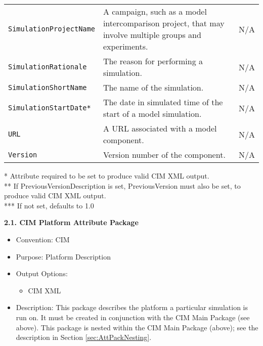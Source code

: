 \begin{tabular}{|p{7cm}|p{5cm}|p{2cm}}
     {\tt SimulationProjectName} & A campaign, such as a model intercomparison project, that may involve multiple groups and experiments. & N/A \\ 
     {\tt SimulationRationale} & The reason for performing a simulation. & N/A\\
     {\tt SimulationShortName} & The name of the simulation. & N/A \\
     {\tt SimulationStartDate*} & The date in simulated time of the start of a model simulation. & N/A\\ 
     {\tt URL} & A URL associated with a model component. & N/A \\
     {\tt Version} & Version number of the component. & N/A \\
     \hline\hline
\end{tabular}
\linebreak
 * Attribute required to be set to produce valid CIM XML output. \\
 ** If PreviousVersionDescription is set, PreviousVersion must also be set, to produce valid CIM XML output. \\
 *** If not set, defaults to 1.0

\vspace{.20in}

{\bf 2.1. CIM Platform Attribute Package}

\begin{itemize}
    \item Convention: CIM
    \item Purpose: Platform Description
    \item Output Options:
    \begin{itemize}
       \item CIM XML 
    \end{itemize} 
    \item Description: This package describes the platform a particular simulation is run on. It must be created in conjunction with the CIM Main Package (see above). This package is nested within the CIM Main Package (above); see the description in Section \ref{sec:AttPackNesting}.
\end{itemize}

